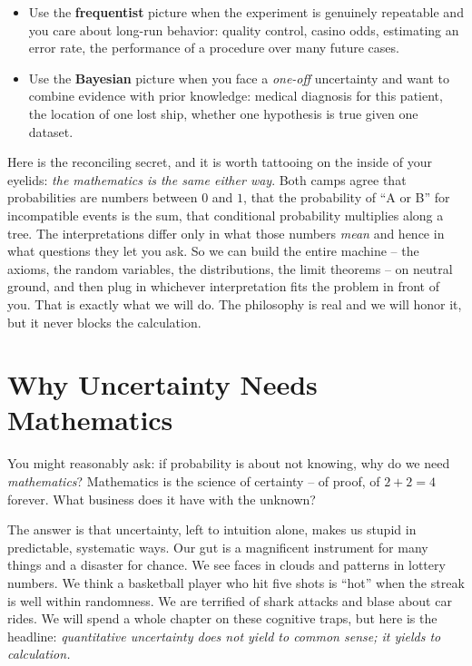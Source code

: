 \begin{itemize}
\item Use the \textbf{frequentist} picture when the experiment is genuinely
repeatable and you care about long-run behavior: quality control, casino odds,
estimating an error rate, the performance of a procedure over many future cases.
\item Use the \textbf{Bayesian} picture when you face a \emph{one-off} uncertainty
and want to combine evidence with prior knowledge: medical diagnosis for this
patient, the location of one lost ship, whether one hypothesis is true given one
dataset.
\end{itemize}

\begin{aestheticbox}
Here is the reconciling secret, and it is worth tattooing on the inside of your
eyelids: \emph{the mathematics is the same either way}. Both camps agree that
probabilities are numbers between $0$ and $1$, that the probability of ``A or B''
for incompatible events is the sum, that conditional probability multiplies along
a tree. The interpretations differ only in what those numbers \emph{mean} and
hence in what questions they let you ask. So we can build the entire machine --
the axioms, the random variables, the distributions, the limit theorems -- on
neutral ground, and then plug in whichever interpretation fits the problem in
front of you. That is exactly what we will do. The philosophy is real and we will
honor it, but it never blocks the calculation.
\end{aestheticbox}

\section{Why Uncertainty Needs Mathematics}
\label{ch01:why-math}

You might reasonably ask: if probability is about not knowing, why do we need
\emph{mathematics}? Mathematics is the science of certainty -- of proof, of $2+2=4$
forever. What business does it have with the unknown?

The answer is that uncertainty, left to intuition alone, makes us stupid in
predictable, systematic ways. Our gut is a magnificent instrument for many things
and a disaster for chance. We see faces in clouds and patterns in lottery numbers.
We think a basketball player who hit five shots is ``hot'' when the streak is well
within randomness. We are terrified of shark attacks and blase about car rides.
We will spend a whole chapter on these cognitive traps, but here is the headline:
\emph{quantitative uncertainty does not yield to common sense; it yields to
calculation.}

